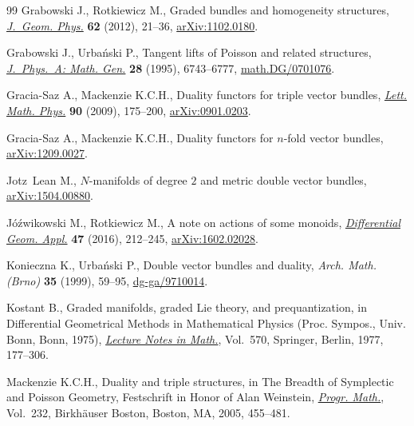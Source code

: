 \documentclass[10pt,a4paper]{amsart}
\numberwithin{equation}{section}
\begin{document}
\begin{thebibliography}{99}
Grabowski J., Rotkiewicz M., Graded bundles and homogeneity structures,
  \href{http://dx.doi.org/10.1016/j.geomphys.2011.09.004}{\textit{J.~Geom. Phys.}} \textbf{62} (2012), 21--36, \href{http://arxiv.org/abs/1102.0180}{arXiv:1102.0180}.

Grabowski J., Urba{\'n}ski P., Tangent lifts of {P}oisson and related
  structures, \href{http://dx.doi.org/10.1088/0305-4470/28/23/024}{\textit{J.~Phys.~A: Math. Gen.}} \textbf{28} (1995), 6743--6777,
  \href{http://arxiv.org/abs/math.DG/0701076}{math.DG/0701076}.

Gracia-Saz A., Mackenzie K.C.H., Duality functors for triple vector bundles,
  \href{http://dx.doi.org/10.1007/s11005-009-0346-z}{\textit{Lett. Math. Phys.}} \textbf{90} (2009), 175--200, \href{http://arxiv.org/abs/0901.0203}{arXiv:0901.0203}.

Gracia-Saz A., Mackenzie K.C.H., Duality functors for $n$-fold vector bundles,
  \href{http://arxiv.org/abs/1209.0027}{arXiv:1209.0027}.

Jotz~Lean M., $N$-manifolds of degree $2$ and metric double vector bundles,
  \href{http://arxiv.org/abs/1504.00880}{arXiv:1504.00880}.

J{\'o}{\'z}wikowski M., Rotkiewicz M., A note on actions of some monoids,
  \href{http://dx.doi.org/10.1016/j.difgeo.2016.04.003}{\textit{Differential Geom. Appl.}} \textbf{47} (2016), 212--245,
  \href{http://arxiv.org/abs/1602.02028}{arXiv:1602.02028}.

Konieczna K., Urba{\'n}ski P., Double vector bundles and duality, \textit{Arch.
  Math. (Brno)} \textbf{35} (1999), 59--95, \href{http://arxiv.org/abs/dg-ga/9710014}{dg-ga/9710014}.

Kostant B., Graded manifolds, graded {L}ie theory, and prequantization, in
  Dif\/ferential Geometrical Methods in Mathematical Physics ({P}roc. {S}ympos.,
  {U}niv. {B}onn, {B}onn, 1975), \href{http://dx.doi.org/10.1007/BFb0087788}{\textit{Lecture Notes in Math.}}, Vol.~570,
  Springer, Berlin, 1977, 177--306.

Mackenzie K.C.H., Duality and triple structures, in The Breadth of Symplectic
  and {P}oisson Geometry, Festschrift in Honor of Alan Weinstein,
  \href{http://dx.doi.org/10.1007/0-8176-4419-9_15}{\textit{Progr. Math.}}, Vol.~232, Birkh\"auser Boston, Boston, MA, 2005,
  455--481.


\end{thebibliography}
\end{document}
